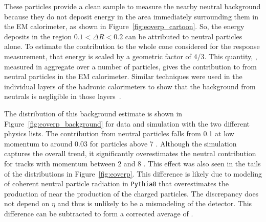 These particles provide a clean sample to measure the nearby neutral background because they do not deposit energy in the area immediately surrounding them in the EM calorimeter, as shown in Figure~\ref{fig:eoverp_cartoon}.
So, the energy deposits in the region $0.1 < \Delta R < 0.2$ can be attributed to neutral particles alone.
To estimate the contribution to the whole cone considered for the response measurement, that energy is scaled by a geometric factor of 4/3. 
This quantity, \epbg, measured in aggregate over a number of particles, gives the contribution to \epav from neutral particles in the EM calorimeter. 
Similar techniques were used in the individual layers of the hadronic calorimeters to show that the background from neutrals is negligible in those layers~\cite{PERF-2011-05}. 

The distribution of this background estimate is shown in Figure~\ref{fig:eoverp_background} for data and simulation with the two different physics lists.
The contribution from neutral particles falls from 0.1 at low momentum to around 0.03 for particles above 7 \GeV. 
Although the simulation captures the overall trend, it significantly overestimates the neutral contribution for tracks with momentum between 2 and 8 \GeV.
This effect was also seen in the tails of the \ep distributions in Figure~\ref{fig:eoverp}.
This difference is likely due to modeling of coherent neutral particle radiation in \texttt{Pythia8} that overestimates the production of \piz near the production of the charged particles.
The discrepancy does not depend on $\eta$ and thus is unlikely to be a mismodeling of the detector.
This difference can be subtracted to form a corrected average of \ep.

